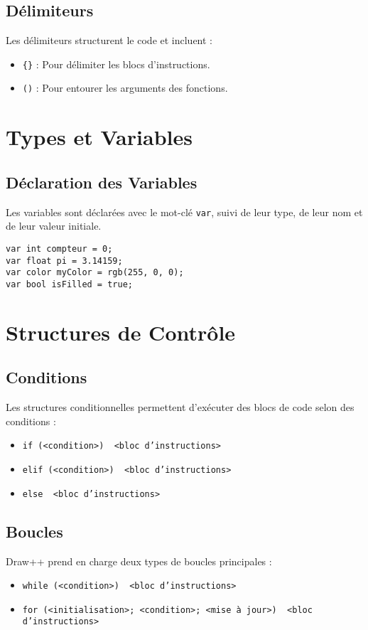 \documentclass[12pt,a4paper]{report}
\begin{document}
\subsection{Délimiteurs}
Les délimiteurs structurent le code et incluent :
\begin{itemize}
    \item \texttt{\{\}} : Pour délimiter les blocs d'instructions.
    \item \texttt{()} : Pour entourer les arguments des fonctions.
\end{itemize}

\section{Types et Variables}

\subsection{Déclaration des Variables}
Les variables sont déclarées avec le mot-clé \texttt{var}, suivi de leur type, de leur nom et de leur valeur initiale.
\begin{lstlisting}[language=Draw++]
var int compteur = 0;
var float pi = 3.14159;
var color myColor = rgb(255, 0, 0);
var bool isFilled = true;
\end{lstlisting}

\section{Structures de Contrôle}

\subsection{Conditions}
Les structures conditionnelles permettent d'exécuter des blocs de code selon des conditions :
\begin{itemize}
    \item \texttt{if (<condition>) { <bloc d'instructions> }}
    \item \texttt{elif (<condition>) { <bloc d'instructions> }}
    \item \texttt{else { <bloc d'instructions> }}
\end{itemize}

\subsection{Boucles}
Draw++ prend en charge deux types de boucles principales :
\begin{itemize}
    \item \texttt{while (<condition>) { <bloc d'instructions> }}
    \item \texttt{for (<initialisation>; <condition>; <mise à jour>) { <bloc d'instructions> }}
\end{itemize}
\end{document}
